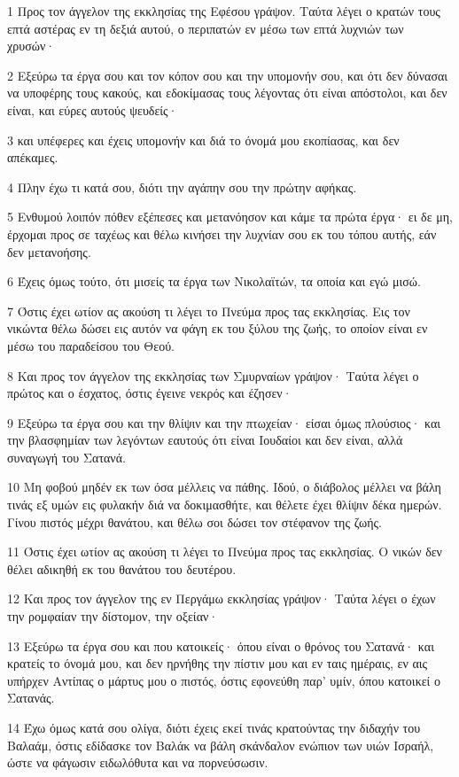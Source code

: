 \par 1 Προς τον άγγελον της εκκλησίας της Εφέσου γράψον. Ταύτα λέγει ο κρατών τους επτά αστέρας εν τη δεξιά αυτού, ο περιπατών εν μέσω των επτά λυχνιών των χρυσών·
\par 2 Εξεύρω τα έργα σου και τον κόπον σου και την υπομονήν σου, και ότι δεν δύνασαι να υποφέρης τους κακούς, και εδοκίμασας τους λέγοντας ότι είναι απόστολοι, και δεν είναι, και εύρες αυτούς ψευδείς·
\par 3 και υπέφερες και έχεις υπομονήν και διά το όνομά μου εκοπίασας, και δεν απέκαμες.
\par 4 Πλην έχω τι κατά σου, διότι την αγάπην σου την πρώτην αφήκας.
\par 5 Ενθυμού λοιπόν πόθεν εξέπεσες και μετανόησον και κάμε τα πρώτα έργα· ει δε μη, έρχομαι προς σε ταχέως και θέλω κινήσει την λυχνίαν σου εκ του τόπου αυτής, εάν δεν μετανοήσης.
\par 6 Έχεις όμως τούτο, ότι μισείς τα έργα των Νικολαϊτών, τα οποία και εγώ μισώ.
\par 7 Όστις έχει ωτίον ας ακούση τι λέγει το Πνεύμα προς τας εκκλησίας. Εις τον νικώντα θέλω δώσει εις αυτόν να φάγη εκ του ξύλου της ζωής, το οποίον είναι εν μέσω του παραδείσου του Θεού.
\par 8 Και προς τον άγγελον της εκκλησίας των Σμυρναίων γράψον· Ταύτα λέγει ο πρώτος και ο έσχατος, όστις έγεινε νεκρός και έζησεν·
\par 9 Εξεύρω τα έργα σου και την θλίψιν και την πτωχείαν· είσαι όμως πλούσιος· και την βλασφημίαν των λεγόντων εαυτούς ότι είναι Ιουδαίοι και δεν είναι, αλλά συναγωγή του Σατανά.
\par 10 Μη φοβού μηδέν εκ των όσα μέλλεις να πάθης. Ιδού, ο διάβολος μέλλει να βάλη τινάς εξ υμών εις φυλακήν διά να δοκιμασθήτε, και θέλετε έχει θλίψιν δέκα ημερών. Γίνου πιστός μέχρι θανάτου, και θέλω σοι δώσει τον στέφανον της ζωής.
\par 11 Όστις έχει ωτίον ας ακούση τι λέγει το Πνεύμα προς τας εκκλησίας. Ο νικών δεν θέλει αδικηθή εκ του θανάτου του δευτέρου.
\par 12 Και προς τον άγγελον της εν Περγάμω εκκλησίας γράψον· Ταύτα λέγει ο έχων την ρομφαίαν την δίστομον, την οξείαν·
\par 13 Εξεύρω τα έργα σου και που κατοικείς· όπου είναι ο θρόνος του Σατανά· και κρατείς το όνομά μου, και δεν ηρνήθης την πίστιν μου και εν ταις ημέραις, εν αις υπήρχεν Αντίπας ο μάρτυς μου ο πιστός, όστις εφονεύθη παρ' υμίν, όπου κατοικεί ο Σατανάς.
\par 14 Έχω όμως κατά σου ολίγα, διότι έχεις εκεί τινάς κρατούντας την διδαχήν του Βαλαάμ, όστις εδίδασκε τον Βαλάκ να βάλη σκάνδαλον ενώπιον των υιών Ισραήλ, ώστε να φάγωσιν ειδωλόθυτα και να πορνεύσωσιν.
